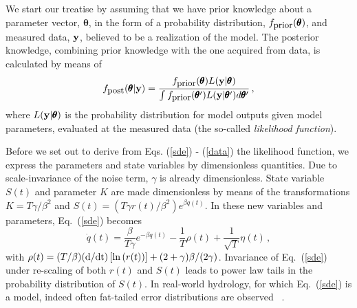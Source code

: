 \documentclass[11pt]{article}
\newcommand{\vc}[1]{{\bf #1 }}
\theoremstyle{definition}
\newcommand{\bt}{\pmb\theta}
\begin{document}
We start our treatise by assuming that we have prior knowledge about a parameter vector, $\bt$, in the form of a probability distribution, $f_{\mbox{\small prior}}(\bt)$, and measured data, $\vc y$, believed to be a realization of the model.
The posterior knowledge, combining prior knowledge with the one acquired from data, is calculated by means of
\begin{equation}\label{Bayes}
  f_{\mbox{\small post}}(\bt|\vc y)
  =
  \frac{f_{\mbox{\small prior}}(\bt)L(\vc y|\bt)}
  {\int f_{\mbox{\small prior}}(\bt')L(\vc y|\bt')d\bt'}\,,
\end{equation}
where $L(\vc y|\bt)$ is the probability distribution for model outputs given model parameters, evaluated at the measured data (the so-called {\em likelihood function}).

Before we set out to derive from Eqs. (\ref{sde}) - (\ref{data}) the likelihood function, we express the parameters and state variables by dimensionless quantities.
Due to scale-invariance of the noise term, $\gamma$ is already dimensionless. State variable $S(t)$ and parameter $K$ are made dimensionless by means of the transformations $K=T\gamma/\beta^2$ and $S(t)=(T\gamma r(t)/\beta^2)e^{\beta q(t)}$.
In these new variables and parameters, Eq.~(\ref{sde}) becomes
\begin{equation}\label{standardform}
  \dot q(t)
  =
  \frac{\beta}{T\gamma}e^{-\beta q(t)}
  -
  \frac{1}{T}\rho(t)
  +
  \frac{1}{\sqrt{T}}\eta(t)\,,
\end{equation}
with $\rho(t)  =  (T/\beta)(\mbox d/\mbox{dt})\left[ \ln \left( r(t) \right) \right]
  +
  (2+\gamma)\beta/(2\gamma)$.
Invariance of Eq.~(\ref{sde}) under re-scaling of both $r(t)$ and $S(t)$ leads to power law tails in the probability distribution of $S(t)$. In real-world hydrology, for which Eq.~(\ref{sde}) is a model, indeed often fat-tailed error distributions are observed ~\cite{thyer_2009_fattails}.
\end{document}
